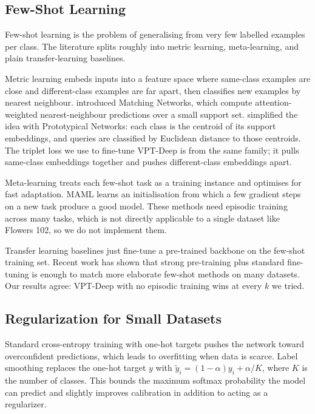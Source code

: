 \subsection{Few-Shot Learning}

Few-shot learning is the problem of generalising from very few labelled examples per class. The literature splits roughly into metric learning, meta-learning, and plain transfer-learning baselines.

Metric learning embeds inputs into a feature space where same-class examples are close and different-class examples are far apart, then classifies new examples by nearest neighbour. \citet{vinyals2016matching} introduced Matching Networks, which compute attention-weighted nearest-neighbour predictions over a small support set. \citet{snell2017prototypical} simplified the idea with Prototypical Networks: each class is the centroid of its support embeddings, and queries are classified by Euclidean distance to those centroids. The triplet loss we use to fine-tune VPT-Deep is from the same family; it pulls same-class embeddings together and pushes different-class embeddings apart.

Meta-learning treats each few-shot task as a training instance and optimises for fast adaptation. MAML \citep{finn2017maml} learns an initialisation from which a few gradient steps on a new task produce a good model. These methods need episodic training across many tasks, which is not directly applicable to a single dataset like Flowers 102, so we do not implement them.

Transfer learning baselines just fine-tune a pre-trained backbone on the few-shot training set. Recent work has shown that strong pre-training plus standard fine-tuning is enough to match more elaborate few-shot methods on many datasets. Our results agree: VPT-Deep with no episodic training wins at every $k$ we tried.

\subsection{Regularization for Small Datasets}

Standard cross-entropy training with one-hot targets pushes the network toward overconfident predictions, which leads to overfitting when data is scarce. Label smoothing \citep{szegedy2016rethinking} replaces the one-hot target $y$ with $\tilde{y}_i = (1 - \alpha) y_i + \alpha / K$, where $K$ is the number of classes. This bounds the maximum softmax probability the model can predict and slightly improves calibration in addition to acting as a regularizer.

